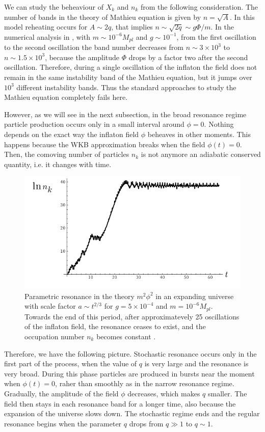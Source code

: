 \documentclass[11pt,a4paper,twoside]{book}
\begin{document}
We can study the beheaviour of $ X_{k} $ and $ n_{k} $ from the following consideration. The number of bands in the theory of Mathieu equation is given by $ n=\sqrt{A} $. In this model reheating occurs for $ A\sim 2q $, that implies $ n\sim\sqrt{2q}\sim g\Phi/m $. In the numerical analysis in \cite{Chap4:LindePreheatingModel}, with $ m\sim 10^{-6} M_{pl} $ and $ g\sim 10^{-1} $, from the first oscillation to the second oscillation the band number decreases from $ n \sim 3 \times 10^{3} $ to $ n\sim 1.5 \times 10^{3} $, because the amplitude $\Phi$ drops by a factor two after the second oscillation. Therefore, during a single oscillation of the inflaton the field does not remain in the same instability band of the Mathieu equation, but it jumps over $ 10^{3} $ different instability bands. Thus the standard approaches to study the Mathieu equation completely fails here.

However, as we will see in the next subsection, in the broad resonance regime particle production occurs only in a small interval around $ \phi=0 $. Nothing depends on the exact way the inflaton field $\phi$ beheaves in other moments. This happens because the WKB approximation breaks when the field $ \phi(t)=0 $. Then, the comoving number of particles $ n_{k} $  is not anymore an adiabatic conserved quantity, i.e. it changes with time. 

\begin{figure}
	\centering
	\includegraphics[width=0.7\linewidth, height=0.3\textheight]{Images/Chap4/Linde_Fig6}
	\caption{Parametric resonance in the theory $ m^{2}\phi^{2} $ in an expanding universe with scale factor $ a\sim t^{2/3}$ for $g=5\times 10^{-4} $ and $ m=10^{-6} M_{pl} $. Towards the end of this period, after approximatevely 25 oscillations of the inflaton field, the resonance ceases to exist, and the occupation number $ n_{k} $ becomes constant \cite{Chap4:LindePreheatingModel}.}
	\label{fig:lindefig6}
\end{figure}
Therefore, we have the following picture. Stochastic resonance occurs only in the first part of the process, when the value of  $ q $ is very large and the resonance is very broad.  During this phase particles are produced in bursts near the moment when $ \phi(t)=0 $, raher than smoothly as in the narrow resonance regime. Gradually, the amplitude of the field $\phi$ decreases, which makes $ q $ smaller. The field then stays in each resonance band for a longer time, also because the expansion of the universe slows down. The stochastic regime ends and the regular resonance begins when the parameter $ q $ drops from $ q \gg 1 $ to $ q \sim 1 $.
\end{document}
